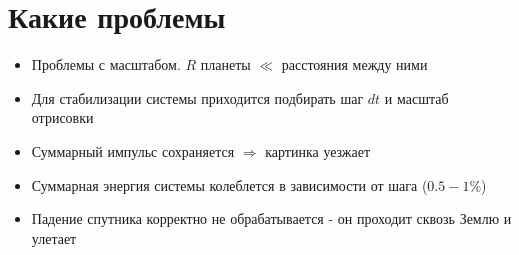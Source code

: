 \documentclass{beamer}
\begin{document}
\section{Какие проблемы}

\begin{frame}
  \begin{itemize}
    \item<1-> Проблемы с масштабом. $R$ планеты $\ll$ расстояния между ними
    \item<2-> Для стабилизации системы приходится подбирать шаг $dt$ и масштаб отрисовки
    \item<3-> Суммарный импульс сохраняется $\Rightarrow$ картинка уезжает
    \item<4-> Суммарная энергия системы колеблется в зависимости от шага ($0.5 - 1\%$)
    \item<5-> Падение спутника корректно не обрабатывается - он проходит сквозь Землю и улетает
  \end{itemize}
\end{frame}
\end{document}
